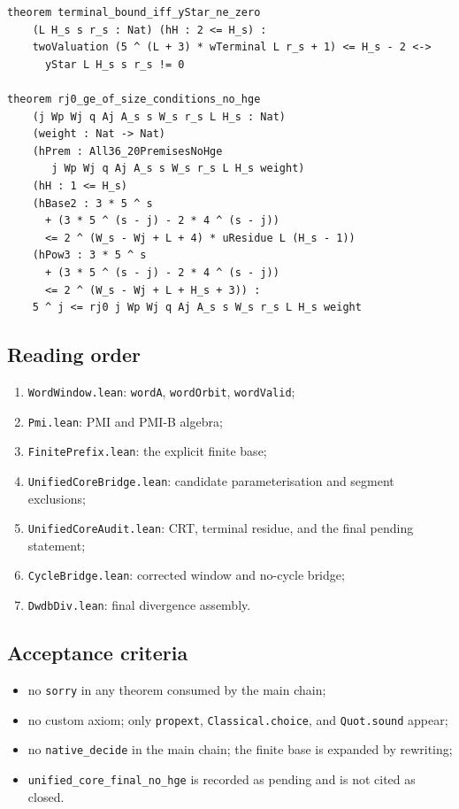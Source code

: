 \begin{verbatim}
theorem terminal_bound_iff_yStar_ne_zero
    (L H_s s r_s : Nat) (hH : 2 <= H_s) :
    twoValuation (5 ^ (L + 3) * wTerminal L r_s + 1) <= H_s - 2 <->
      yStar L H_s s r_s != 0

theorem rj0_ge_of_size_conditions_no_hge
    (j Wp Wj q Aj A_s s W_s r_s L H_s : Nat)
    (weight : Nat -> Nat)
    (hPrem : All36_20PremisesNoHge
       j Wp Wj q Aj A_s s W_s r_s L H_s weight)
    (hH : 1 <= H_s)
    (hBase2 : 3 * 5 ^ s
      + (3 * 5 ^ (s - j) - 2 * 4 ^ (s - j))
      <= 2 ^ (W_s - Wj + L + 4) * uResidue L (H_s - 1))
    (hPow3 : 3 * 5 ^ s
      + (3 * 5 ^ (s - j) - 2 * 4 ^ (s - j))
      <= 2 ^ (W_s - Wj + L + H_s + 3)) :
    5 ^ j <= rj0 j Wp Wj q Aj A_s s W_s r_s L H_s weight
\end{verbatim}

\subsection{Reading order}

\begin{enumerate}[leftmargin=*]
\item \texttt{WordWindow.lean}: \texttt{wordA}, \texttt{wordOrbit},
  \texttt{wordValid};
\item \texttt{Pmi.lean}: PMI and PMI-B algebra;
\item \texttt{FinitePrefix.lean}: the explicit finite base;
\item \texttt{UnifiedCoreBridge.lean}: candidate parameterisation and
  segment exclusions;
\item \texttt{UnifiedCoreAudit.lean}: CRT, terminal residue, and the
  final pending statement;
\item \texttt{CycleBridge.lean}: corrected window and no-cycle bridge;
\item \texttt{DwdbDiv.lean}: final divergence assembly.
\end{enumerate}

\subsection{Acceptance criteria}

\begin{itemize}[leftmargin=*]
\item no \texttt{sorry} in any theorem consumed by the main chain;
\item no custom axiom; only \texttt{propext},
  \texttt{Classical.choice}, and \texttt{Quot.sound} appear;
\item no \texttt{native\_decide} in the main chain; the finite base is
  expanded by rewriting;
\item \texttt{unified\_core\_final\_no\_hge} is recorded as pending and
  is not cited as closed.
\end{itemize}
